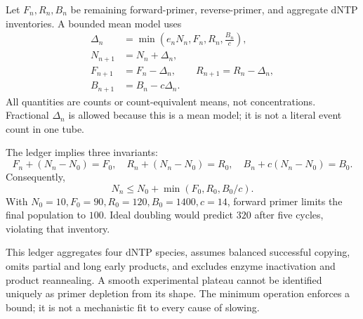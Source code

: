 Let $F_n,R_n,B_n$ be remaining forward-primer, reverse-primer, and aggregate dNTP inventories. A bounded mean model uses
\begin{align}
\Delta_n&=\min\left(e_nN_n,F_n,R_n,\frac{B_n}{c}\right),\\
N_{n+1}&=N_n+\Delta_n,\\
F_{n+1}&=F_n-\Delta_n,\qquad R_{n+1}=R_n-\Delta_n,\\
B_{n+1}&=B_n-c\Delta_n. \label{eq:budget}
\end{align}
All quantities are counts or count-equivalent means, not concentrations. Fractional $\Delta_n$ is allowed because this is a mean model; it is not a literal event count in one tube.

The ledger implies three invariants:
\begin{equation}
F_n+(N_n-N_0)=F_0,\quad
R_n+(N_n-N_0)=R_0,\quad
B_n+c(N_n-N_0)=B_0.
\end{equation}
Consequently,
\begin{equation}
N_n\leq N_0+\min(F_0,R_0,B_0/c).
\end{equation}
With $N_0=10,F_0=90,R_0=120,B_0=1400,c=14$, forward primer limits the final population to $100$. Ideal doubling would predict $320$ after five cycles, violating that inventory.

\begin{center}\end{center}
This ledger aggregates four dNTP species, assumes balanced successful copying, omits partial and long early products, and excludes enzyme inactivation and product reannealing. A smooth experimental plateau cannot be identified uniquely as primer depletion from its shape. The minimum operation enforces a bound; it is not a mechanistic fit to every cause of slowing.



